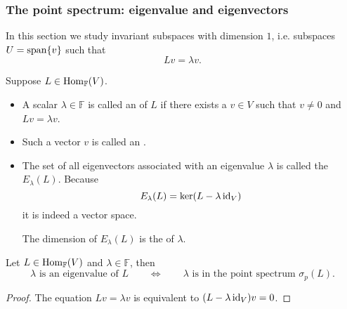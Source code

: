 \subsubsection{The point spectrum: eigenvalue and eigenvectors}
In this section we study invariant subspaces with dimension $1$, i.e. subspaces $U= \operatorname{span}\{v\}$ such that
\[ Lv = \lambda v. \]
\begin{definition}
Suppose $L\in \operatorname{Hom}_{\mathbb{F}}(V)$.
\begin{itemize}
\item  A scalar $\lambda\in \mathbb{F}$ is called an  of $L$ if there exists a $v\in V$ such that $v\neq 0$ and $Lv = \lambda v$.
\item Such a vector $v$ is called an .
\item The set of all eigenvectors associated with an eigenvalue $\lambda$ is called the  $E_\lambda(L)$. Because
\[ E_\lambda(L) = \ker(L-\lambda \operatorname{id}_V) \]
it is indeed a vector space.

The dimension of $E_\lambda(L)$ is the  of $\lambda$.
\end{itemize}
\end{definition}
\begin{proposition}
Let $L\in \operatorname{Hom}_\mathbb{F}(V)$ and $\lambda\in \mathbb{F}$, then
\[ \text{$\lambda$ is an eigenvalue of $L$} \qquad \iff \qquad \text{$\lambda$ is in the point spectrum $\sigma_p(L)$.} \]
\end{proposition}
\begin{proof}
The equation $Lv = \lambda v$ is equivalent to $(L-\lambda \operatorname{id}_V)v = 0$.
\end{proof}


